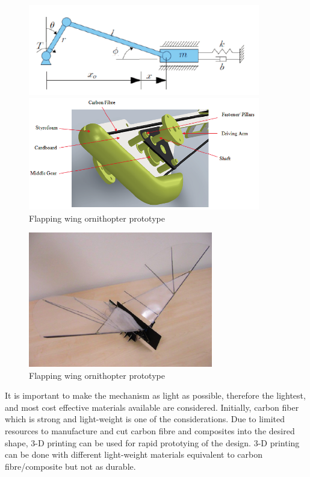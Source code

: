 \documentclass{article}
\begin{document}
\begin{figure}
    \centering
    \begin{minipage}{0.5\textwidth}
        \centering
        \includegraphics[width=0.9\textwidth]{p2.png} %
    \end{minipage}\hfill
    \begin{minipage}{0.5\textwidth}
        \centering
        \includegraphics[width=0.9\textwidth]{p3.png} %
    \end{minipage}
\caption{ Flapping wing ornithopter prototype}
\label{fig:p2}
\end{figure}

\begin{figure}[h!]
\centering
\includegraphics[scale=0.5]{p1.png}
\caption{ Flapping wing ornithopter prototype}
\label{fig:p1}
\end{figure}

It is important to make the mechanism as light as possible, therefore the lightest, and most cost
effective materials available are considered. Initially, carbon fiber which is strong and light-weight is one of the considerations. Due to limited resources to manufacture and cut carbon fibre and composites into the desired  shape, 3-D printing can be used for rapid prototying of the design. 3-D printing can be done with different  light-weight materials equivalent to carbon fibre/composite but not as durable.
\end{document}
